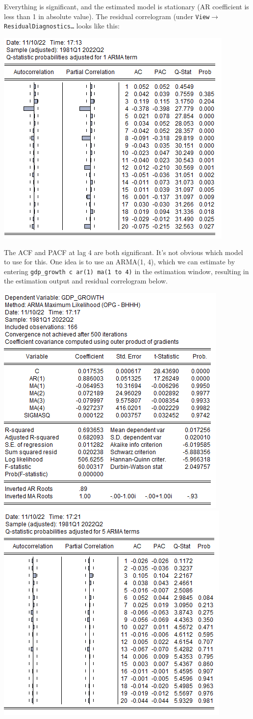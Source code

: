 \documentclass[11pt, a4paper]{article}
\begin{document}
\begin{enumerate}
\begin{enumerate}
\begin{center}
\end{center}
Everything is significant, and the estimated model is stationary (AR coefficient is less than 1 in absolute value). The residual correlogram (under \texttt{View$\rightarrow$Residual\linebreak Diagnostics\ldots} looks like this:
\begin{center}
\includegraphics[width=.6\textwidth]{corr_ar1_gdpg}
\end{center}
The ACF and PACF at lag 4 are both significant. It's not obvious which model to use for this. One idea is to use an ARMA(1, 4), which we can estimate by entering \verb.gdp_growth c ar(1) ma(1 to 4). in the estimation window, resulting in the estimation output and residual correlogram below.
\begin{center}
\includegraphics[width=.6\textwidth]{arma14_gdpg}
\includegraphics[width=.6\textwidth]{corr_arma14_gdpg}

\end{center}
\end{enumerate}
\end{enumerate}
\end{document}
